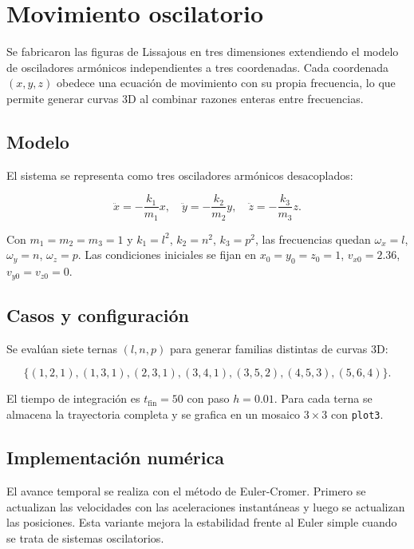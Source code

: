 \section{Movimiento oscilatorio}
Se fabricaron las figuras de Lissajous en tres dimensiones extendiendo el modelo de osciladores armónicos independientes a tres 
coordenadas. Cada coordenada $(x, y, z)$ obedece una ecuación de movimiento con su propia frecuencia, lo que permite generar curvas 
3D al combinar razones enteras entre frecuencias.

\subsection{Modelo}
El sistema se representa como tres osciladores armónicos desacoplados:

\begin{equation}
\ddot{x} = -\frac{k_1}{m_1} x, \quad
\ddot{y} = -\frac{k_2}{m_2} y, \quad
\ddot{z} = -\frac{k_3}{m_3} z.
\end{equation}

Con $m_1 = m_2 = m_3 = 1$ y $k_1 = l^2$, $k_2 = n^2$, $k_3 = p^2$, las frecuencias quedan $\omega_x = l$, $\omega_y = n$, 
$\omega_z = p$. Las condiciones iniciales se fijan en $x_0 = y_0 = z_0 = 1$, $v_{x0} = 2.36$, $v_{y0} = v_{z0} = 0$.

\subsection{Casos y configuración}
Se evalúan siete ternas $(l, n, p)$ para generar familias distintas de curvas 3D:

\begin{equation}
\{(1,2,1), (1,3,1), (2,3,1), (3,4,1), (3,5,2), (4,5,3), (5,6,4)\}.
\end{equation}

El tiempo de integración es $t_\text{fin} = 50$ con paso $h = 0.01$. Para cada terna se almacena la trayectoria completa y se 
grafica en un mosaico $3\times3$ con \texttt{plot3}.

\subsection{Implementación numérica}
El avance temporal se realiza con el método de Euler-Cromer. Primero se actualizan las velocidades con las aceleraciones 
instantáneas y luego se actualizan las posiciones. Esta variante mejora la estabilidad frente al Euler simple cuando se trata 
de sistemas oscilatorios.

